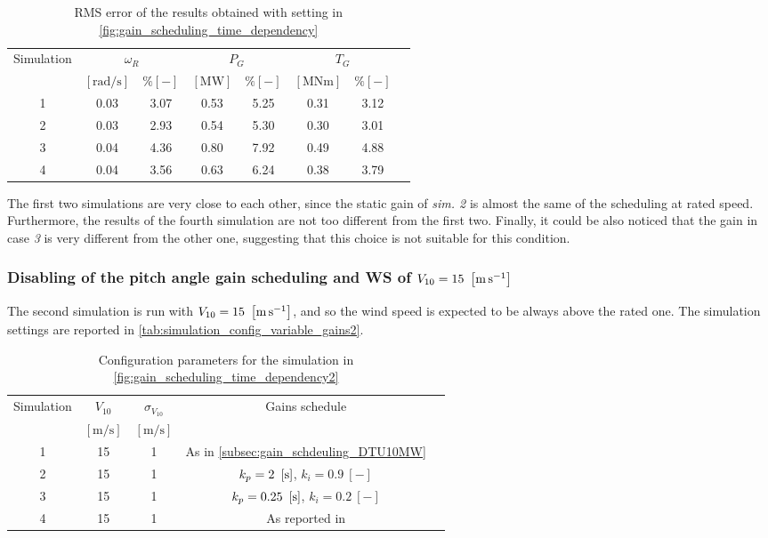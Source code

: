 \begin{table}[htb]
  \caption{RMS error of the results obtained with setting in \autoref{fig:gain_scheduling_time_dependency}}
  \centering
  \begin{tabular}{cccccccc}
    \toprule
      Simulation & \multicolumn{2}{c}{$\omega_R$} & \multicolumn{2}{c}{$P_G$} & \multicolumn{2}{c}{$T_G$} \\ 
       & $\left[\si{\radian\per\second}\right]$ & $ \% \left[-\right]$ & $\left[\si{\mega\watt}\right]$ & $ \% \left[-\right]$ & $\left[\si{\mega\newton\meter} \right]$ & $ \% \left[-\right]$ \\ \midrule       
       1 &  0.03 &  3.07 &  0.53  &  5.25  &  0.31  &  3.12 \\
       2 &  0.03 &  2.93 &  0.54  &  5.30  &  0.30  &  3.01 \\
       3 &  0.04 &  4.36 &  0.80  &  7.92  &  0.49  &  4.88 \\
       4 &  0.04 &  3.56 &  0.63  &  6.24  &  0.38  &  3.79 \\
     \bottomrule
  \end{tabular}
  \label{tab:res_variable_gains}
\end{table}

The first two simulations are very close to each other, since the static gain of \textit{sim. 2} is almost the same of the scheduling at rated speed. Furthermore, the results of the fourth simulation are not too different from the first two. Finally, it could be also noticed that the gain in case \textit{3} is very different from the other one, suggesting that this choice is not suitable for this condition. 

\subsubsection{Disabling of the pitch angle gain scheduling and WS of $V_{10}=15 \ \left[\si{\meter\per\second}\right]$}
The second simulation is run with $V_{10}=15 \ \left[\si{\meter\per\second}\right]$, and so the wind speed is expected to be always above the rated one. The simulation settings are reported in \autoref{tab:simulation_config_variable_gains2}.
\begin{table}[htb]
  \caption{Configuration parameters for the simulation in \autoref{fig:gain_scheduling_time_dependency2}}
  \centering
  \begin{tabular}{ccccc}
  \toprule
    Simulation & $V_{10}$  & $\sigma_{V_{10}}$ & Gains schedule \\ 
     & $\left[\si{\meter\per\second}\right]$ & $\left[\si{\meter\per\second}\right]$ & \\ \midrule       
     1 & 15 & 1 & As in \autoref{subsec:gain_schdeuling_DTU10MW}  \\
     2 & 15 & 1 & $k_p = 2 \ \mesunt{\second}$, $k_i=0.9 \ [-]$ \\
     3 & 15 & 1 & $k_p = 0.25 \ \mesunt{\second}$, $k_i=0.2 \ [-]$  \\
     4 & 15 & 1 & As reported in \cite{Olimpo_Anaya‐Lara}  \\
     \bottomrule
  \end{tabular}
  \label{tab:simulation_config_variable_gains2}
\end{table}


